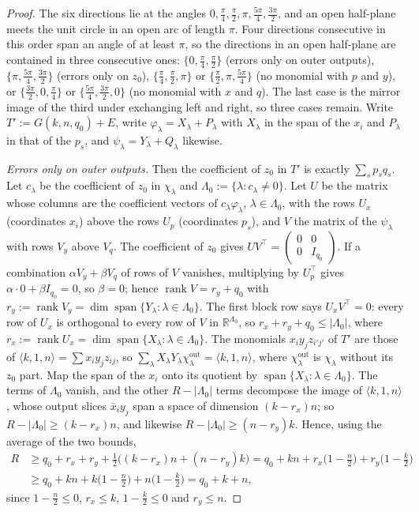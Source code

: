 \documentclass[11pt]{article}
\theoremstyle{definition}
\theoremstyle{remark}
\begin{document}
\begin{proof}
The six directions lie at the angles $0,\frac\pi4,\frac\pi2,\pi,\frac{5\pi}4,\frac{3\pi}2$, and an open half-plane meets the unit circle in an open arc of length $\pi$. Four directions consecutive in this order span an angle of at least $\pi$, so the directions in an open half-plane are contained in three consecutive ones: $\{0,\frac\pi4,\frac\pi2\}$ (errors only on outer outputs), $\{\pi,\frac{5\pi}4,\frac{3\pi}2\}$ (errors only on $z_0$), $\{\frac\pi4,\frac\pi2,\pi\}$ or $\{\frac\pi2,\pi,\frac{5\pi}4\}$ (no monomial with $p$ and $y$), or $\{\frac{3\pi}2,0,\frac\pi4\}$ or $\{\frac{5\pi}4,\frac{3\pi}2,0\}$ (no monomial with $x$ and $q$). The last case is the mirror image of the third under exchanging left and right, so three cases remain. Write $T':=G(k,n,q_0)+E$, write $\varphi_\lambda=X_\lambda+P_\lambda$ with $X_\lambda$ in the span of the $x_i$ and $P_\lambda$ in that of the $p_s$, and $\psi_\lambda=Y_\lambda+Q_\lambda$ likewise.

\emph{Errors only on outer outputs.} Then the coefficient of $z_0$ in $T'$ is exactly $\sum_sp_sq_s$. Let $c_\lambda$ be the coefficient of $z_0$ in $\chi_\lambda$ and $\Lambda_0:=\{\lambda:c_\lambda\ne0\}$. Let $U$ be the matrix whose columns are the coefficient vectors of $c_\lambda\varphi_\lambda$, $\lambda\in\Lambda_0$, with the rows $U_x$ (coordinates $x_i$) above the rows $U_p$ (coordinates $p_s$), and $V$ the matrix of the $\psi_\lambda$ with rows $V_y$ above $V_q$. The coefficient of $z_0$ gives $UV^\top=\begin{pmatrix}0&0\\0&I_{q_0}\end{pmatrix}$. If a combination $\alpha V_y+\beta V_q$ of rows of $V$ vanishes, multiplying by $U_p^\top$ gives $\alpha\cdot0+\beta I_{q_0}=0$, so $\beta=0$; hence $\operatorname{rank}V=r_y+q_0$ with $r_y:=\operatorname{rank}V_y=\dim\operatorname{span}\{Y_\lambda:\lambda\in\Lambda_0\}$. The first block row says $U_xV^\top=0$: every row of $U_x$ is orthogonal to every row of $V$ in $\mathbb R^{\Lambda_0}$, so $r_x+r_y+q_0\le|\Lambda_0|$, where $r_x:=\operatorname{rank}U_x=\dim\operatorname{span}\{X_\lambda:\lambda\in\Lambda_0\}$. The monomials $x_iy_jz_{i'j'}$ of $T'$ are those of $\langle k,1,n\rangle=\sum x_iy_jz_{ij}$, so $\sum_\lambda X_\lambda Y_\lambda\chi^{\mathrm{out}}_\lambda=\langle k,1,n\rangle$, where $\chi^{\mathrm{out}}_\lambda$ is $\chi_\lambda$ without its $z_0$ part. Map the span of the $x_i$ onto its quotient by $\operatorname{span}\{X_\lambda:\lambda\in\Lambda_0\}$. The terms of $\Lambda_0$ vanish, and the other $R-|\Lambda_0|$ terms decompose the image of $\langle k,1,n\rangle$, whose output slices $\bar x_iy_j$ span a space of dimension $(k-r_x)n$; so $R-|\Lambda_0|\ge(k-r_x)n$, and likewise $R-|\Lambda_0|\ge(n-r_y)k$. Hence, using the average of the two bounds,
\begin{align*}
R&\ge q_0+r_x+r_y+\tfrac12\big((k-r_x)n+(n-r_y)k\big)=q_0+kn+r_x\big(1-\tfrac n2\big)+r_y\big(1-\tfrac k2\big)\\
&\ge q_0+kn+k\big(1-\tfrac n2\big)+n\big(1-\tfrac k2\big)=q_0+k+n,
\end{align*}
since $1-\frac n2\le0$, $r_x\le k$, $1-\frac k2\le0$ and $r_y\le n$.


\end{proof}
\end{document}
